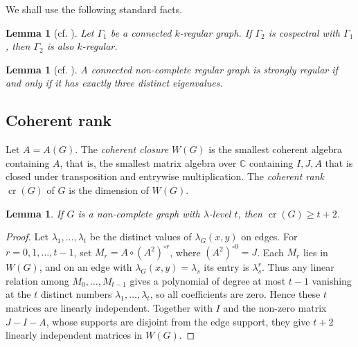 \documentclass[reqno,a4paper,11pt]{article}
\newtheorem{lem}[thm]{Lemma}
\theoremstyle{definition}
\theoremstyle{remark}
\begin{document}
We shall use the following standard facts.

\begin{lem}[{cf. \cite[Proposition 2]{vdh2003}}]\label{regular}
Let $\Gamma_1$ be a connected $k$-regular graph.  If $\Gamma_2$ is cospectral with $\Gamma_1$, then $\Gamma_2$ is also $k$-regular.
\end{lem}

\begin{lem}[{cf. \cite[Lemma 10.2.1]{god01}}]\label{srg}
A connected non-complete regular graph is strongly regular if and only if it has exactly three distinct eigenvalues.
\end{lem}



\subsection{Coherent rank}
Let $A=A(G)$.  The \emph{coherent closure} $W(G)$ is the smallest coherent algebra containing $A$, that is, the smallest matrix algebra over $\mathbb C$ containing $I,J,A$ that is closed under transposition and entrywise multiplication.  The \emph{coherent rank} $\operatorname{cr}(G)$ of $G$ is the dimension of $W(G)$.

\begin{lem}\label{lem:coherent-rank-lambda-level}
If $G$ is a non-complete graph with $\lambda$-level $t$, then $\operatorname{cr}(G)\ge t+2$.
\end{lem}

\begin{proof}
Let $\lambda_1,\ldots,\lambda_t$ be the distinct values of $\lambda_G(x,y)$ on edges.  For $r=0,1,\ldots,t-1$, set $M_r=A\circ(A^2)^{\circ r}$, where $(A^2)^{\circ0}=J$.  Each $M_r$ lies in $W(G)$, and on an edge with $\lambda_G(x,y)=\lambda_s$ its entry is $\lambda_s^r$.  Thus any linear relation among $M_0,\ldots,M_{t-1}$ gives a polynomial of degree at most $t-1$ vanishing at the $t$ distinct numbers $\lambda_1,\ldots,\lambda_t$, so all coefficients are zero.  Hence these $t$ matrices are linearly independent.  Together with $I$ and the non-zero matrix $J-I-A$, whose supports are disjoint from the edge support, they give $t+2$ linearly independent matrices in $W(G)$.
\end{proof}
\end{document}
